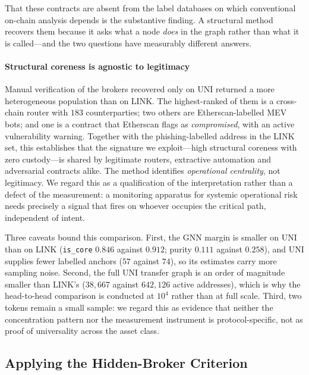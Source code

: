 \documentclass[final,5p,times]{elsarticle}
\begin{document}
That these contracts are absent from the label databases on which
conventional on-chain analysis depends is the substantive finding. A
structural method recovers them because it asks what a node \emph{does} in
the graph rather than what it is called---and the two questions have
measurably different answers.

\paragraph{Structural coreness is agnostic to legitimacy}
Manual verification of the brokers recovered only on UNI returned a more
heterogeneous population than on LINK. The highest-ranked of them is a
cross-chain router with $183$ counterparties; two others are
Etherscan-labelled MEV bots; and one is a contract that Etherscan flags as
\emph{compromised}, with an active vulnerability warning. Together with the
phishing-labelled address in the
LINK set, this establishes that the signature we exploit---high structural
coreness with zero custody---is shared by legitimate routers, extractive
automation and adversarial contracts alike. The method identifies
\emph{operational centrality}, not legitimacy. We regard this as a
qualification of the interpretation rather than a defect of the measurement:
a monitoring apparatus for systemic operational risk needs precisely a
signal that fires on whoever occupies the critical path, independent of
intent.

Three caveats bound this comparison. First, the GNN margin is smaller on
UNI than on LINK (\texttt{is\_core} $0.846$ against $0.912$; purity
$0.111$ against $0.258$), and UNI supplies fewer labelled anchors
($57$ against $74$), so its estimates carry more sampling noise. Second,
the full UNI transfer graph is an order of magnitude smaller than LINK's
($38{,}667$ against $642{,}126$ active addresses), which is why the
head-to-head comparison is conducted at $10^4$ rather than at full scale.
Third, two tokens remain a small sample: we regard this as evidence that
neither the concentration pattern nor the measurement instrument is
protocol-specific, not as proof of universality across the asset class.

\subsection{Applying the Hidden-Broker Criterion}
\label{sec:c3}
\end{document}

